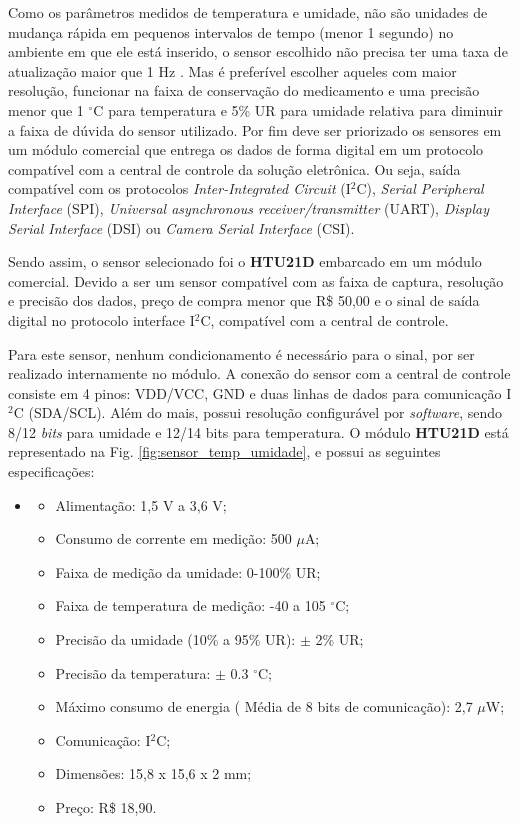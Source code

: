     Como os parâmetros medidos de temperatura e umidade, não são unidades de mudança rápida em pequenos intervalos de tempo (menor 1 segundo) no ambiente em que ele está inserido, o sensor escolhido não precisa ter uma taxa de atualização maior que 1 Hz \cite{webster2018measurement}. Mas é preferível escolher aqueles com maior resolução, funcionar na faixa de conservação do medicamento e uma precisão menor que 1 $^\circ$C para temperatura e 5\% UR para umidade relativa para diminuir a faixa de dúvida do sensor utilizado. Por fim deve ser priorizado os sensores em um módulo comercial que entrega os dados de forma digital em um protocolo compatível com a central de controle da solução eletrônica. Ou seja, saída compatível com os protocolos \textit{Inter-Integrated Circuit} (I$^2$C), \textit{Serial Peripheral Interface} (SPI), \textit{Universal asynchronous receiver/transmitter} (UART), \textit{Display Serial Interface} (DSI) ou \textit{Camera Serial Interface} (CSI).
    
    Sendo assim, o sensor selecionado foi o \textbf{HTU21D} embarcado em um módulo comercial. Devido a ser um sensor compatível com as faixa de captura, resolução e precisão dos dados, preço de compra menor que R\$ 50,00  e o sinal de saída digital no protocolo interface I$^2$C, compatível com a central de controle.
    
    Para este sensor, nenhum condicionamento é necessário para o sinal, por ser realizado internamente no módulo. A conexão do sensor com a central de controle consiste em 4 pinos: VDD/VCC, GND e duas linhas de dados para comunicação I$^2$C (SDA/SCL). Além do mais, possui resolução configurável por \textit{software}, sendo 8/12 \textit{bits} para umidade e 12/14 bits para temperatura. O módulo \textbf{HTU21D} está representado na Fig. \ref{fig:sensor_temp_umidade}, e possui as seguintes especificações:

    \begin{itemize}
    \item[ ]
        \begin{itemize}
            \item Alimentação: 1,5 V a 3,6 V;
            \item Consumo de corrente em medição: 500 $\mu$A;
            \item Faixa de medição da umidade: 0-100\% UR;
            \item Faixa de temperatura de medição: -40 a 105 $^\circ$C;
            \item Precisão da umidade (10\% a 95\% UR):  $\pm$ 2\% UR;
            \item Precisão da temperatura: $\pm$ 0.3 $^\circ$C;
            \item Máximo consumo de energia ( Média de 8 bits de comunicação): 2,7 $\mu$W;
            \item Comunicação: I$^2$C;
            \item Dimensões: 15,8 x 15,6 x 2 mm;
            \item Preço: R\$ 18,90.
        \end{itemize}
    \end{itemize}
    
